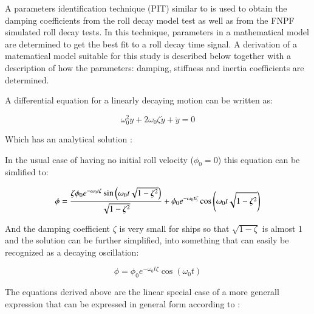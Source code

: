     A parameters identification technique (PIT) similar to
\cite{7505983/EXYJELCU} is used to obtain the damping coefficients from
the roll decay model test as well as from the FNPF simulated roll decay
tests. In this technique, parameters in a mathematical model are
determined to get the best fit to a roll decay time signal. A derivation
of a matematical model suitable for this study is described below
together with a description of how the parameters: damping, stiffness
and inertia coefficients are determined.

A differential equation for a linearly decaying motion can be written
as:
 
            
    
    \begin{equation}
\omega_{0}^{2} y + 2 \omega_{0} \zeta \dot{y} + \ddot{y} = 0
\label{eq:equation}
\end{equation}

    

    Which has an analytical solution \cite{undefined}:

    In the usual case of having no initial roll velocity (\(\phi_0=0\)) this
equation can be simlified to:
 
            
    
    \begin{equation}
\phi = \frac{\zeta \phi_{0} e^{- \omega_{0} t \zeta} \operatorname{sin}\left(\omega_{0} t \sqrt{1 - \zeta^{2}}\right)}{\sqrt{1 - \zeta^{2}}} \\ + \phi_{0} e^{- \omega_{0} t \zeta} \operatorname{cos}\left(\omega_{0} t \sqrt{1 - \zeta^{2}}\right)
\label{eq:equation}
\end{equation}

    

    And the damping coefficient \(\zeta\) is very small for ships so that
\(\sqrt{1-\zeta}\) is almost 1 and the solution can be further
simplified, into something that can easily be recognized as a decaying
oscillation:
 
            
    
    \begin{equation}
\phi = \phi_{0} e^{- \omega_{0} t \zeta} \operatorname{cos}\left(\omega_{0} t\right)
\label{eq:equation}
\end{equation}

    

    The equations derived above are the linear special case of a more
generall expression that can be expressed in general form according to
\cite{7505983/FB64RGPF}:
 
